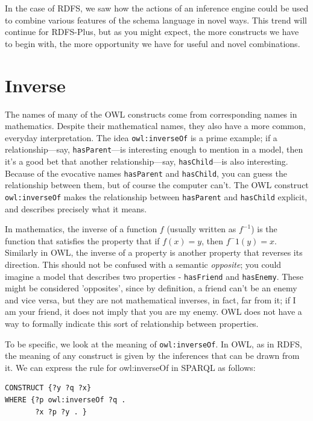 In the case of RDFS, we saw how the actions of an inference engine could
be used to combine various features of the schema language in novel
ways. This trend will continue for RDFS-Plus, but as you might expect,
the more constructs we have to begin with, the more opportunity we have
for useful and novel combinations.

\section{Inverse}

The names of many of the OWL constructs come from corresponding names in
mathematics. Despite their mathematical names, they also have a more
common, everyday interpretation. The idea \texttt{owl:inverseOf} is a prime
example; if a relationship---say, \texttt{hasParent}---is interesting enough to
mention in a model, then it's a good bet that another
relationship---say, \texttt{hasChild}---is also interesting. Because of the
evocative names \texttt{hasParent} and \texttt{hasChild}, you can guess the relationship
between them, but of course the computer can't. The OWL construct
\texttt{owl:inverseOf} makes the relationship between \texttt{hasParent} and \texttt{hasChild}
explicit, and describes precisely what it means.

In mathematics, the inverse of a function $f$ (usually written as $f^{-1}$) is
the function that satisfies the
property that if $f(x) = y$, then $f^-1(y) = x$. Similarly in OWL, the
inverse of a property is another property that reverses its direction.  This should not be confused with 
a semantic \textit{opposite};  you could imagine a model that describes two 
properties - \texttt{hasFriend} and \texttt{hasEnemy}.  These might be considered 'opposites', since 
by definition, a friend can't be an enemy and vice versa, but they are not mathematical inverses, in fact, far from it;
if I am your friend, it does not imply that you are my enemy.  OWL does not have a way to formally indicate this sort of 
relationship between properties. 

To be specific, we look at the meaning of \texttt{owl:inverseOf}. In OWL, as in
RDFS, the meaning of any construct is given by the inferences that can
be drawn from it. We can express the rule for owl:inverseOf in SPARQL as
follows:

\begin{lstlisting}
CONSTRUCT {?y ?q ?x}
WHERE {?p owl:inverseOf ?q .
       ?x ?p ?y . }
\end{lstlisting}


